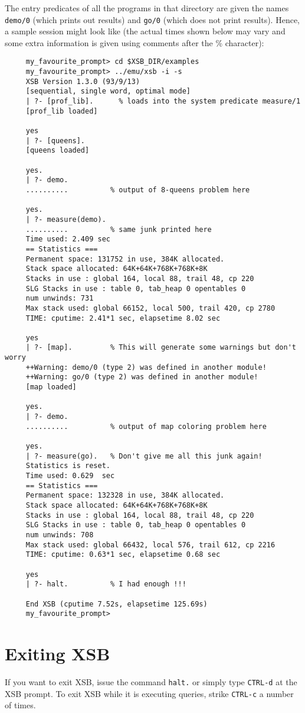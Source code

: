 The entry predicates of all the programs in that directory are given
the names {\tt demo/0} (which prints out results) and {\tt go/0}
(which does not print results). Hence, a sample session might look like
(the actual times shown below may vary and some extra information is given
using comments after the \% character):

{\footnotesize
 \begin{verbatim}
     my_favourite_prompt> cd $XSB_DIR/examples
     my_favourite_prompt> ../emu/xsb -i -s
     XSB Version 1.3.0 (93/9/13)
     [sequential, single word, optimal mode]
     | ?- [prof_lib].      % loads into the system predicate measure/1
     [prof_lib loaded]

     yes
     | ?- [queens].
     [queens loaded]

     yes.
     | ?- demo.
     ..........          % output of 8-queens problem here

     yes.
     | ?- measure(demo).
     ..........          % same junk printed here
     Time used: 2.409 sec
     == Statistics ===      
     Permanent space: 131752 in use, 384K allocated.
     Stack space allocated: 64K+64K+768K+768K+8K
     Stacks in use : global 164, local 88, trail 48, cp 220
     SLG Stacks in use : table 0, tab_heap 0 opentables 0
     num unwinds: 731
     Max stack used: global 66152, local 500, trail 420, cp 2780
     TIME: cputime: 2.41*1 sec, elapsetime 8.02 sec

     yes
     | ?- [map].         % This will generate some warnings but don't worry
     ++Warning: demo/0 (type 2) was defined in another module!
     ++Warning: go/0 (type 2) was defined in another module!
     [map loaded]

     yes.
     | ?- demo.
     ..........          % output of map coloring problem here

     yes.
     | ?- measure(go).   % Don't give me all this junk again!
     Statistics is reset.
     Time used: 0.629  sec
     == Statistics ===      
     Permanent space: 132328 in use, 384K allocated.
     Stack space allocated: 64K+64K+768K+768K+8K
     Stacks in use : global 164, local 88, trail 48, cp 220
     SLG Stacks in use : table 0, tab_heap 0 opentables 0
     num unwinds: 708
     Max stack used: global 66432, local 576, trail 612, cp 2216
     TIME: cputime: 0.63*1 sec, elapsetime 0.68 sec

     yes
     | ?- halt.          % I had enough !!!

     End XSB (cputime 7.52s, elapsetime 125.69s)
     my_favourite_prompt>
 \end{verbatim}
}


\section{Exiting XSB}

If you want to exit XSB, issue the command \verb'halt.' or
simply type \verb'CTRL-d' at the XSB prompt. To exit XSB while it is
executing queries, strike \verb'CTRL-c' a number of times.


